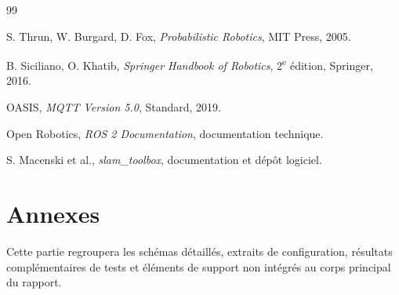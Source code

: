\documentclass[11pt,a4paper]{report}
\begin{document}
\begin{thebibliography}{99}

S. Thrun, W. Burgard, D. Fox, \textit{Probabilistic Robotics}, MIT Press, 2005.

B. Siciliano, O. Khatib, \textit{Springer Handbook of Robotics}, 2\textsuperscript{e} édition, Springer, 2016.

OASIS, \textit{MQTT Version 5.0}, Standard, 2019.

Open Robotics, \textit{ROS 2 Documentation}, documentation technique.

S. Macenski et al., \textit{slam\_toolbox}, documentation et dépôt logiciel.

\end{thebibliography}

\appendix
\chapter{Annexes}

Cette partie regroupera les schémas détaillés, extraits de configuration, résultats complémentaires de tests et éléments de support non intégrés au corps principal du rapport.
\end{document}

